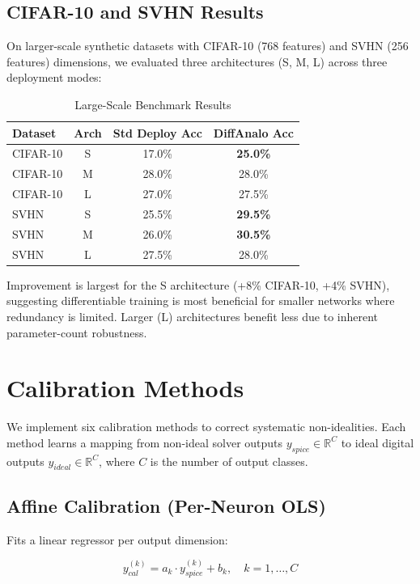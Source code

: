 \documentclass[10pt,twocolumn]{article}
\begin{document}
\subsection{CIFAR-10 and SVHN Results}

On larger-scale synthetic datasets with CIFAR-10 (768 features) and SVHN (256 features) dimensions, we evaluated three architectures (S, M, L) across three deployment modes:

\begin{table}[t]
  \centering
  \caption{Large-Scale Benchmark Results}
  \label{tab:largescale}
  \begin{tabular}{lccc}
    \toprule
    Dataset & Arch & Std Deploy Acc & DiffAnalo Acc \\
    \midrule
    CIFAR-10 & S & 17.0\% & \textbf{25.0\%} \\
    CIFAR-10 & M & 28.0\% & 28.0\% \\
    CIFAR-10 & L & 27.0\% & 27.5\% \\
    SVHN & S & 25.5\% & \textbf{29.5\%} \\
    SVHN & M & 26.0\% & \textbf{30.5\%} \\
    SVHN & L & 27.5\% & 28.0\% \\
    \bottomrule
  \end{tabular}
\end{table}

Improvement is largest for the S architecture (+8\% CIFAR-10, +4\% SVHN), suggesting differentiable training is most beneficial for smaller networks where redundancy is limited. Larger (L) architectures benefit less due to inherent parameter-count robustness.

\section{Calibration Methods}

We implement six calibration methods to correct systematic non-idealities. Each method learns a mapping from non-ideal solver outputs $y_{spice} \in \mathbb{R}^C$ to ideal digital outputs $y_{ideal} \in \mathbb{R}^C$, where $C$ is the number of output classes.

\subsection{Affine Calibration (Per-Neuron OLS)}

Fits a linear regressor per output dimension:

\begin{equation}
y_{cal}^{(k)} = a_k \cdot y_{spice}^{(k)} + b_k, \quad k = 1, \dots, C
\end{equation}
\end{document}
